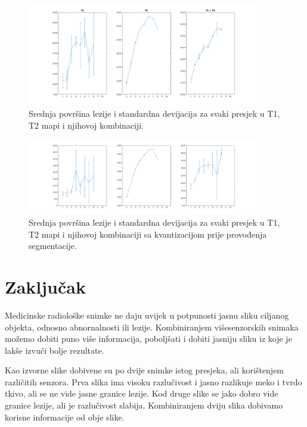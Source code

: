 \documentclass[lmodern, utf8, seminar]{fer}
\begin{document}
\begin{figure}[H]
	\centering
	\includegraphics[width=0.9\textwidth]{error}
	\caption{Srednja površina lezije i standardna devijacija za svaki presjek u T1, T2 mapi i njihovoj kombinaciji.}
	\label{fig:error}
\end{figure}

\begin{figure}[H]
	\centering
	\includegraphics[width=0.9\textwidth]{errorQuant}
	\caption{Srednja površina lezije i standardna devijacija za svaki presjek u T1, T2 mapi i njihovoj kombinaciji sa kvantizacijom prije provođenja segmentacije.}
	\label{fig:results}
\end{figure}



\chapter{Zaključak}
Medicinske radiološke snimke ne daju uvijek u potpunosti jasnu sliku ciljanog objekta, odnosno abnornalnosti ili lezije. Kombiniranjem višesenzorskih snimaka možemo dobiti puno više informacija, poboljšati i dobiti jasniju sliku iz koje je lakše izvući bolje rezultate.

Kao izvorne slike dobivene su po dvije snimke istog presjeka, ali korištenjem različitih senzora. Prva slika ima visoku razlučivost i jasno razlikuje meko i tvrdo tkivo, ali se ne vide jasne granice lezije. Kod druge slike se jako dobro vide granice lezije, ali je razlučivost slabija. Kombiniranjem dviju slika dobivamo korisne informacije od obje slike. 
\end{document}
